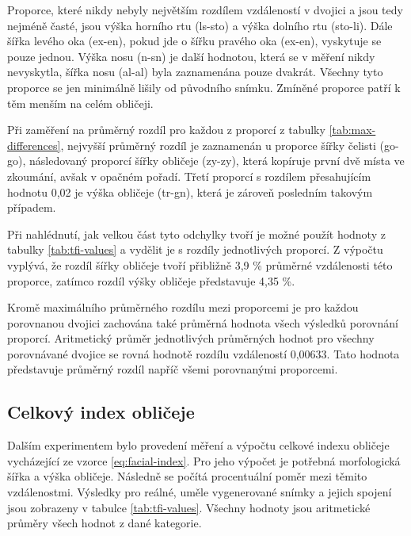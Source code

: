 Proporce, které nikdy nebyly největším rozdílem vzdáleností v dvojici a jsou tedy nejméně časté, jsou výška horního rtu (ls-sto) a výška dolního rtu (sto-li). Dále šířka levého oka (ex-en), pokud jde o šířku pravého oka (ex-en), vyskytuje se pouze jednou. Výška nosu (n-sn) je další hodnotou, která se v měření nikdy nevyskytla, šířka nosu (al-al) byla zaznamenána pouze dvakrát. Všechny tyto proporce se jen minimálně lišily od původního snímku. Zmíněné proporce patří k těm menším na celém obličeji.

\bigskip

\noindent Při zaměření na průměrný rozdíl pro každou z proporcí z tabulky \ref{tab:max-differences}, nejvyšší průměrný rozdíl je zaznamenán u proporce šířky čelisti (go-go), následovaný proporcí šířky obličeje (zy-zy), která kopíruje první dvě místa ve zkoumání, avšak v opačném pořadí. Třetí proporcí s rozdílem přesahujícím hodnotu 0,02 je výška obličeje (tr-gn), která je zároveň posledním takovým případem.

Při nahlédnutí, jak velkou část tyto odchylky tvoří je možné použít hodnoty z tabulky \ref{tab:tfi-values} a vydělit je s rozdíly jednotlivých proporcí. Z výpočtu vyplývá, že rozdíl šířky obličeje tvoří přibližně 3,9 \% průměrné vzdálenosti této proporce, zatímco rozdíl výšky obličeje představuje 4,35 \%.

\bigskip

\noindent Kromě maximálního průměrného rozdílu mezi proporcemi je pro každou porovnanou dvojici zachována také průměrná hodnota všech výsledků porovnání proporcí. Aritmetický průměr jednotlivých průměrných hodnot pro všechny porovnávané dvojice se rovná hodnotě rozdílu vzdáleností 0,00633. Tato hodnota představuje průměrný rozdíl napříč všemi porovnanými proporcemi.

\subsection*{Celkový index obličeje}

Dalším experimentem bylo provedení měření a výpočtu celkové indexu obličeje vycházející ze vzorce \eqref{eq:facial-index}. Pro jeho výpočet je potřebná morfologická šířka a výška obličeje. Následně se počítá procentuální poměr mezi těmito vzdálenostmi. Výsledky pro reálné, uměle vygenerované snímky a jejich spojení jsou zobrazeny v tabulce \ref{tab:tfi-values}. Všechny hodnoty jsou aritmetické průměry všech hodnot z dané kategorie.

